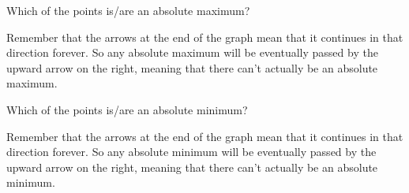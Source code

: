 \documentclass{ximera}
\begin{document}
\begin{problem}
\begin{problem}
        \begin{problem}
            Which of the points is/are an absolute maximum?
            \begin{selectAll}
            \end{selectAll}
            \begin{feedback}
                Remember that the arrows at the end of the graph mean that it continues in that direction forever. So any absolute maximum will be eventually passed by the upward arrow on the right, meaning that there can't actually be an absolute maximum.
            \end{feedback}
            
            \begin{problem}
                Which of the points is/are an absolute minimum?
                \begin{selectAll}
                \end{selectAll}
                \begin{feedback}
                    Remember that the arrows at the end of the graph mean that it continues in that direction forever. So any absolute minimum will be eventually passed by the upward arrow on the right, meaning that there can't actually be an absolute minimum.
                \end{feedback}
            \end{problem}
        \end{problem}
    \end{problem}
\end{problem}
\end{document}
